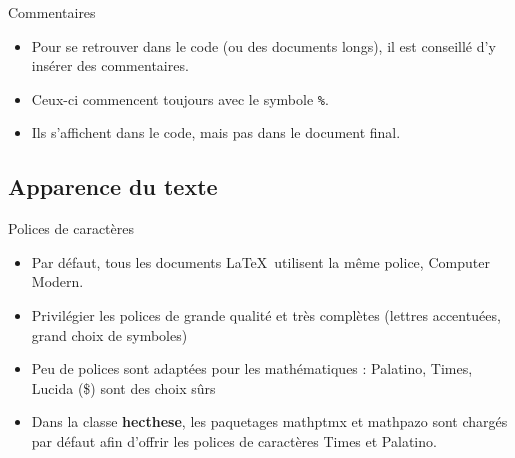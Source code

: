 \begin{frame}[c]{Commentaires}
\begin{itemize}
\item Pour se retrouver dans le code (ou des documents longs), il est conseillé 
d'y insérer des commentaires.
\item Ceux-ci commencent toujours avec le symbole \texttt{\%}.
\item Ils s'affichent dans le code, mais pas dans le document final.
\end{itemize}
\end{frame}

\subsection{Apparence du texte}

\begin{frame}[c]{Polices de caractères}
	\begin{itemize}
		\item Par défaut, tous les documents \LaTeX\ utilisent la même police, \textrm{Computer Modern}.
		\item Privilégier les polices de grande qualité et très complètes (lettres accentuées, grand choix de symboles)
		\item Peu de polices sont adaptées pour les mathématiques : Palatino, Times, Lucida (\$) sont des choix sûrs
		\item Dans la classe \textbf{hecthese}, les paquetages mathptmx et mathpazo sont chargés par défaut afin	d’offrir les polices de caractères Times et Palatino.
	\end{itemize}
\end{frame}

